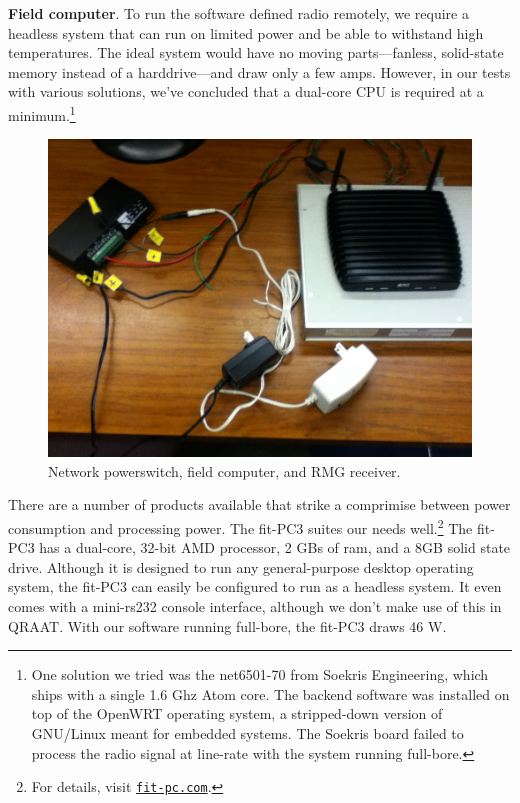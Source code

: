 \documentclass[letter]{article}
\newcounter{foot}
\begin{document}
\textbf{Field computer}. To run the software defined radio remotely, we require a headless system
that can run on limited power and be able to withstand high temperatures. The ideal system would 
have no moving parts---fanless, solid-state memory instead of a harddrive---and draw only a few 
amps. However, in our tests with various solutions, we've concluded that a dual-core CPU is 
required at a minimum.\footnote{One solution we tried was the net6501-70 from Soekris Engineering, which
ships with a single 1.6 Ghz Atom core. The backend software was installed on top of the OpenWRT operating 
system, a stripped-down version of GNU/Linux meant for embedded systems. The Soekris board failed to 
process the radio signal at line-rate with the system running full-bore.}
\begin{figure}
  \vspace{-10pt}
  \begin{center}
    \includegraphics[scale=0.24]{pictures/power_rmg_computer.JPG}
  \end{center}
  \caption{Network powerswitch, field computer, and RMG receiver.}
  \vspace{-10pt}
\end{figure}
There are a number of products available that strike a comprimise between power consumption 
and processing power. The fit-PC3 suites our needs well.\footnote{For details, visit
\href{http://www.fit-pc.com}{\tt fit-pc.com}.} The fit-PC3 has a dual-core, 32-bit AMD
processor, 2 GBs of ram, and a 8GB solid state drive. Although it is designed to run 
any general-purpose desktop operating system, the fit-PC3 can easily be configured to 
run as a headless system. It even comes with a mini-rs232 console interface, although 
we don't make use of this in QRAAT. With our software running full-bore, the fit-PC3 
draws 46 W. 
\end{document}
